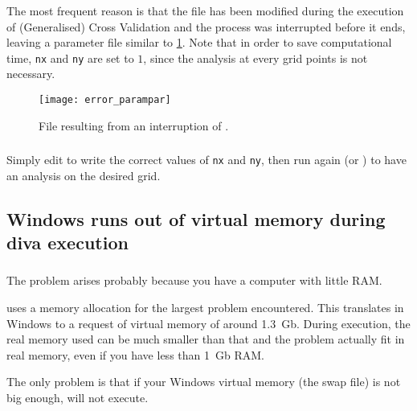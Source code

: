 \subsubsection{\question}

The most frequent reason is that the  file has been modified during the execution of (Generalised) Cross Validation and the process was interrupted before it ends, leaving a parameter file similar to \ref{fig:errorparampar}. Note that in order to save computational time, \texttt{nx} and \texttt{ny} are set to $1$, since the analysis at every grid points is not necessary.

\begin{figure}[htpb]
\centering
\texttt{[image: error\_parampar]}
\caption{File  resulting from an interruption of .\label{fig:errorparampar}}
\end{figure}

\subsubsection{\answer}


Simply edit  to write the correct values of \texttt{nx} and \texttt{ny}, then run again  (or ) to have an analysis on the desired grid.


\subsection{Windows runs out of virtual memory during diva execution}


\subsubsection{\question}

The problem arises probably because you have a computer with little RAM.

\diva uses a memory allocation for the largest problem encountered. This 
translates in Windows to a request of virtual memory of around 1.3~Gb.
During execution, the real memory used can be much smaller than that and 
the problem actually fit in real memory, even if you have less than 1~Gb RAM.

The only problem is that if your Windows virtual memory (the swap file) 
is not big enough, \diva will not execute.


